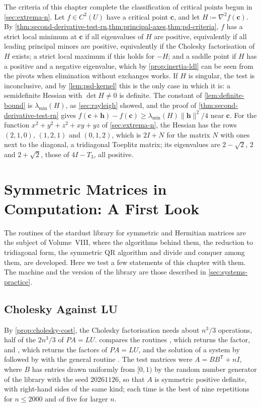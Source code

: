 The criteria of this chapter complete the classification of critical points begun in \cref{sec:extrema-n}. Let $f\in C^2(U)$ have a critical point $\mathbf c$, and let $H\coloneqq\nabla^2f(\mathbf c)$. By \cref{thm:second-derivative-test-rn,thm:principal-axes,thm:pd-criteria}, $f$ has a strict local minimum at $\mathbf c$ if all eigenvalues of $H$ are positive, equivalently if all leading principal minors are positive, equivalently if the Cholesky factorisation of $H$ exists; a strict local maximum if this holds for $-H$; and a saddle point if $H$ has a positive and a negative eigenvalue, which by \cref{prop:inertia-ldl} can be seen from the pivots when elimination without exchanges works. If $H$ is singular, the test is inconclusive, and by \cref{lem:psd-kernel} this is the only case in which it is: a semidefinite Hessian with $\det H\ne0$ is definite. The constant of \cref{lem:definite-bound} is $\lambda_{\min}(H)$, as \cref{sec:rayleigh} showed, and the proof of \cref{thm:second-derivative-test-rn} gives $f(\mathbf c+\mathbf h)-f(\mathbf c)\ge\lambda_{\min}(H)\|\mathbf h\|^2/4$ near $\mathbf c$. For the function $x^2+y^2+z^2+xy+yz$ of \cref{sec:extrema-n}, the Hessian has the rows $(2,1,0)$, $(1,2,1)$ and $(0,1,2)$, which is $2I+N$ for the matrix $N$ with ones next to the diagonal, a tridiagonal Toeplitz matrix; its eigenvalues are $2-\sqrt2$, $2$ and $2+\sqrt2$, those of $4I-T_3$, all positive.

\section{Symmetric Matrices in Computation: A First Look}
\label{sec:symmetric-computation}

The routines of the stardust library for symmetric and Hermitian matrices are the subject of Volume~VIII, where the algorithms behind them, the reduction to tridiagonal form, the symmetric QR algorithm and divide and conquer among them, are developed. Here we test a few statements of this chapter with them. The machine and the version of the library are those described in \cref{sec:systems-practice}.

\subsection{Cholesky Against LU}

By \cref{prop:cholesky-cost}, the Cholesky factorisation needs about $n^3/3$ operations, half of the $2n^3/3$ of $PA=LU$.  compares the routines , which returns the factor, and , which returns the factors of $PA=LU$, and the solution of a system by  followed by  with the general routine . The test matrices were $A=BB^{\mathsf T}+nI$, where $B$ has entries drawn uniformly from $[0,1)$ by the random number generator of the library with the seed $20261126$, so that $A$ is symmetric positive definite, with right-hand sides of the same kind; each time is the best of nine repetitions for $n\le2000$ and of five for larger $n$.

